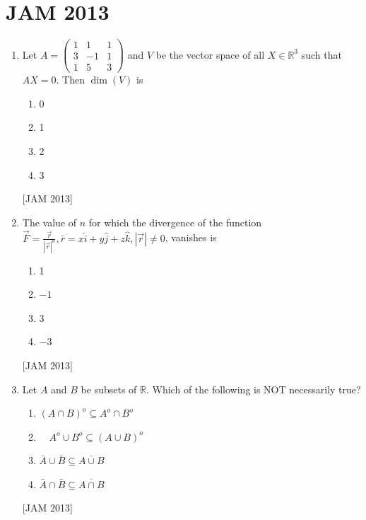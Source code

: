 \section{JAM 2013}
\begin{enumerate}


\item  Let $A=\left(\begin{array}{rrr}1 & 1 & 1 \\  3 & -1 & 1 \\  1 & 5 & 3\end{array}\right)$ and $V$ be the vector space of all $X \in \mathbb{R}^{3}$ such that $A X=0$. Then $\operatorname{dim}(V)$ 
is 


\begin{enumerate}
    \item $ 0$ 
\item 1 
\item 2 
\item 3
\end{enumerate}
\hfill [JAM 2013]





\item  The value of $n$ for which the divergence of the function $\vec{F}=\frac{\vec{r}}{|\vec{r}|^{n}}, \bar{r}=x \hat{i}+y \hat{j}+z \hat{k},|\vec{r}| \neq 0$, vanishes is 

\begin{enumerate} 
\item 1 
\item $-1$ 
\item 3 
\item $-3$

\end{enumerate}
\hfill [JAM 2013]


\item  Let $A$ and $B$ be subsets of $\mathbb{R}$. Which of the following is NOT necessarily true? 


\begin{enumerate}
\item $(A \cap B)^{o} \subseteq A^{o} \cap B^{o}$ 
\item $\quad A^{o} \cup B^{o} \subseteq(A \cup B)^{o}$ 
\item $\bar{A} \cup \bar{B} \subseteq \overline{A \cup B}$ 
\item $\bar{A} \cap \bar{B} \subseteq \overline{A \cap B}$

\end{enumerate}
\hfill [JAM 2013]



\end{enumerate}
